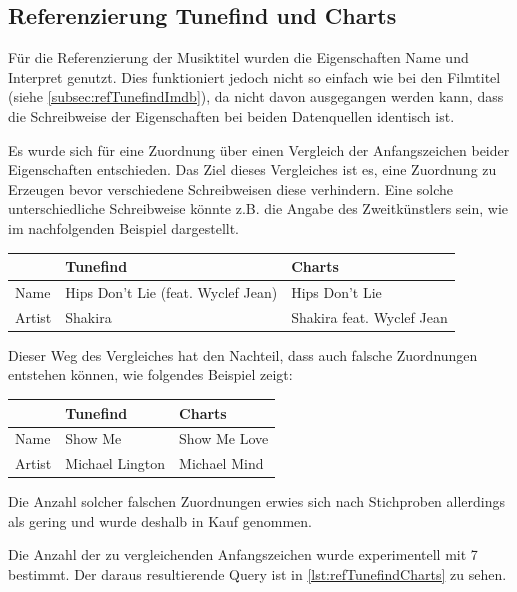 \documentclass[parskip]{scrartcl}
\begin{document}
\subsection{Referenzierung Tunefind und Charts}

Für die Referenzierung der Musiktitel wurden die Eigenschaften Name und Interpret genutzt. Dies funktioniert jedoch nicht so einfach wie bei den Filmtitel (siehe \ref{subsec:refTunefindImdb}), da nicht davon ausgegangen werden kann, dass die Schreibweise der Eigenschaften bei beiden Datenquellen identisch ist.

Es wurde sich für eine Zuordnung über einen Vergleich der Anfangszeichen beider Eigenschaften entschieden. Das Ziel dieses Vergleiches ist es, eine Zuordnung zu Erzeugen bevor verschiedene Schreibweisen diese verhindern. Eine solche unterschiedliche Schreibweise könnte z.B. die Angabe des Zweitkünstlers sein, wie im nachfolgenden Beispiel dargestellt.

\begin{tabular}{p{}|p{}|p{}}
     & \textbf{Tunefind} & \textbf{Charts} \\\hline
    Name & Hips Don't Lie (feat. Wyclef Jean)  & Hips Don't Lie\\
    Artist & Shakira & Shakira feat. Wyclef Jean\\
\end{tabular}

Dieser Weg des Vergleiches hat den Nachteil, dass auch falsche Zuordnungen entstehen können, wie folgendes Beispiel zeigt:

\begin{tabular}{p{}|p{}|p{}}
    & \textbf{Tunefind} & \textbf{Charts} \\\hline
    Name & Show Me  & Show Me Love\\
    Artist & Michael Lington & Michael Mind\\
\end{tabular}

Die Anzahl solcher falschen Zuordnungen erwies sich nach Stichproben allerdings als gering und wurde deshalb in Kauf genommen.

Die Anzahl der zu vergleichenden Anfangszeichen wurde experimentell mit 7 bestimmt. Der daraus resultierende Query ist in \autoref{lst:refTunefindCharts} zu sehen.
\end{document}
